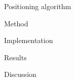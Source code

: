 \newpage
\begin{section}{Positioning algorithm}

    \begin{subsection}{Method}

    \end{subsection}
    \begin{subsection}{Implementation}

    \end{subsection}
    \begin{subsection}{Results}

    \end{subsection}
    \begin{subsection}{Discussion}

    \end{subsection}

\end{section}